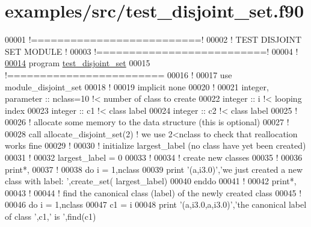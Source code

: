 \hypertarget{test__disjoint__set_8f90_source}{
\section{examples/src/test\-\_\-disjoint\-\_\-set.f90}
}

\begin{DoxyCode}
00001 \textcolor{comment}{!==========================!}
00002 \textcolor{comment}{! TEST DISJOINT SET MODULE !}
00003 \textcolor{comment}{!==========================!}
00004 \textcolor{comment}{!}
\hypertarget{test__disjoint__set_8f90_source_l00014}{}\hyperlink{test__disjoint__set_8f90_ae10b89f154e0887e67a5854100a8f465}{00014} \textcolor{keyword}{program} \hyperlink{test__disjoint__set_8f90_ae10b89f154e0887e67a5854100a8f465}{test_disjoint_set}
00015 \textcolor{comment}{!========================}
00016   \textcolor{comment}{!}
00017   use \textcolor{keywordflow}{module\_disjoint\_set}
00018   \textcolor{comment}{!}
00019   \textcolor{keyword}{implicit none}
00020   \textcolor{comment}{!}
00021   \textcolor{keywordtype}{integer}, \textcolor{keywordtype}{parameter} :: nclass=10 \textcolor{comment}{!< number of class to create}
00022   \textcolor{keywordtype}{integer} :: i \textcolor{comment}{!< looping index}
00023   \textcolor{keywordtype}{integer} :: c1 \textcolor{comment}{!< class label}
00024   \textcolor{keywordtype}{integer} :: c2 \textcolor{comment}{!< class label}
00025   \textcolor{comment}{!}
00026   \textcolor{comment}{! allocate some memory to the data structure (this is optional)}
00027   \textcolor{comment}{!}
00028   call allocate\_disjoint\_set(2) \textcolor{comment}{! we use 2<nclass to check that reallocation
       works fine}
00029   \textcolor{comment}{! }
00030   \textcolor{comment}{! initialize largest\_label (no class have yet been created)}
00031   \textcolor{comment}{!}
00032   largest\_label = 0
00033   \textcolor{comment}{!}
00034   \textcolor{comment}{! create new classes}
00035   \textcolor{comment}{!}
00036   print*,
00037   \textcolor{comment}{!}
00038   \textcolor{keyword}{do} i = 1,nclass
00039      print \textcolor{stringliteral}{'(a,i3.0)'},\textcolor{stringliteral}{'we just created a new class with label: '},create\_set(
      largest\_label)
00040   \textcolor{keyword}{enddo}
00041   \textcolor{comment}{!}
00042   print*,
00043   \textcolor{comment}{!}
00044   \textcolor{comment}{! find the canonical class (label) of the newly created class}
00045   \textcolor{comment}{! }
00046   \textcolor{keyword}{do} i = 1,nclass
00047      c1 = i
00048      print \textcolor{stringliteral}{'(a,i3.0,a,i3.0)'},\textcolor{stringliteral}{'the canonical label of class '},c1,\textcolor{stringliteral}{' is '},find(c1)

\end{DoxyCode}
